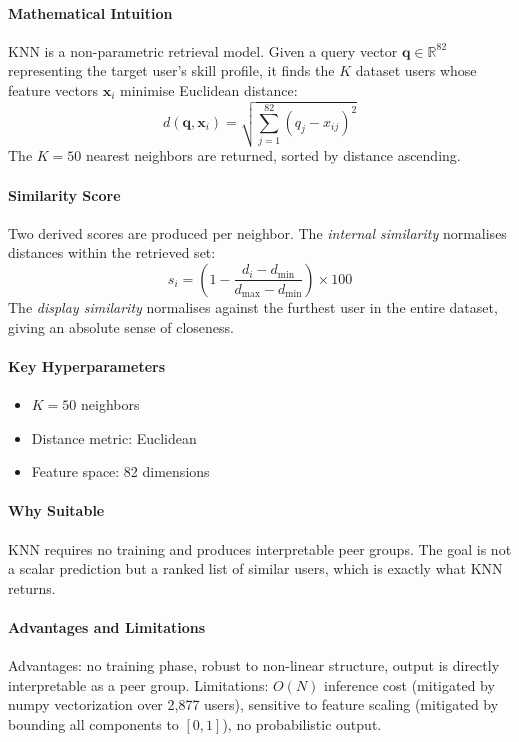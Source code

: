 \documentclass[12pt,a4paper]{article}
\begin{document}
\paragraph{Mathematical Intuition}
KNN is a non-parametric retrieval model. Given a query vector $\mathbf{q} \in
\mathbb{R}^{82}$ representing the target user's skill profile, it finds the $K$
dataset users whose feature vectors $\mathbf{x}_i$ minimise Euclidean distance:
\[
    d(\mathbf{q}, \mathbf{x}_i) = \sqrt{\sum_{j=1}^{82}(q_j - x_{ij})^2}
\]
The $K=50$ nearest neighbors are returned, sorted by distance ascending.

\paragraph{Similarity Score}
Two derived scores are produced per neighbor. The \emph{internal similarity}
normalises distances within the retrieved set:
\[
    s_i = \left(1 - \frac{d_i - d_{\min}}{d_{\max} - d_{\min}}\right) \times 100
\]
The \emph{display similarity} normalises against the furthest user in the entire
dataset, giving an absolute sense of closeness.

\paragraph{Key Hyperparameters}
\begin{itemize}
    \item $K = 50$ neighbors
    \item Distance metric: Euclidean
    \item Feature space: 82 dimensions
\end{itemize}

\paragraph{Why Suitable}
KNN requires no training and produces interpretable peer groups. The goal is not
a scalar prediction but a ranked list of similar users, which is exactly what KNN
returns.

\paragraph{Advantages and Limitations}
Advantages: no training phase, robust to non-linear structure, output is directly interpretable as a peer group. \newline
Limitations: $O(N)$ inference cost (mitigated by
numpy vectorization over 2,877 users), sensitive to feature scaling (mitigated by
bounding all components to $[0,1]$), no probabilistic output.
\end{document}
